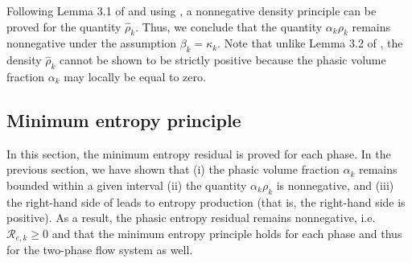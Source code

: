 %
Following Lemma 3.1 of \cite{jlg_VR_SIAM_2004} and using , a nonnegative density principle can be proved for the quantity 
$\hat{\rho}_k$. Thus, we conclude that the quantity $\alpha_k \rho_k$ remains nonnegative under the assumption $\beta_k = \kappa_k$. 
Note that unlike Lemma 3.2 of \cite{jlg_VR_SIAM_2004}, the density 
$\hat{\rho}_k$ cannot be shown to be strictly positive because the phasic volume fraction $\alpha_k$ may locally be equal to zero.
%
%
\subsection{Minimum entropy principle}\label{sct:end-min-pr}
%
In this section, the minimum entropy residual is proved for each phase. 
In the previous section, we have shown  that 
(i) the phasic volume fraction $\alpha_k$ remains bounded within a given interval 
(ii)  the quantity $\alpha_k \rho_k$ is nonnegative, 
and (iii) the right-hand side of  leads to entropy production (that is, the right-hand side is positive). 
As a result, the phasic entropy residual remains nonnegative, i.e. $\mathcal{R}_{e,k} \geq 0$
and that the minimum entropy principle holds for each phase and thus for the two-phase flow system as well.

